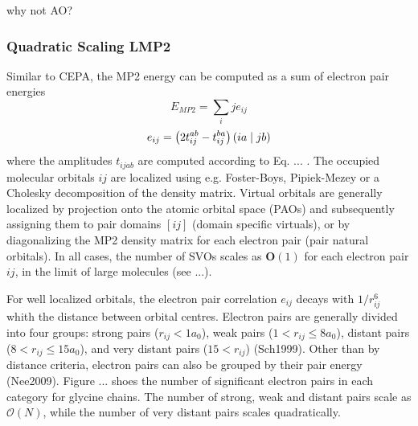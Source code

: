 why not AO?

\subsubsection{Quadratic Scaling LMP2}

Similar to CEPA, the MP2 energy can be computed as a sum of electron pair energies
\begin{equation}
E_{MP2} = \sum_ij e_{ij}
\end{equation}
\begin{equation}
e_{ij} = \left( 2t_{ij}^{ab} - t_{ij}^{ba} \right) \left( ia \mid jb \right) 
\end{equation}
\noindent where the amplitudes $t_{ijab}$ are computed according to Eq. ... . The occupied molecular orbitals $ij$ are localized using e.g. Foster-Boys, Pipiek-Mezey or a Cholesky decomposition of the density matrix. Virtual orbitals are generally localized by projection onto the atomic orbital space (PAOs) and subsequently assigning them to pair domains $[ij]$ (domain specific virtuals), or by diagonalizing the MP2 density matrix for each electron pair (pair natural orbitals).  In all cases, the number of SVOs scales as $\mathbf{O}(1)$ for each electron pair $ij$, in the limit of large molecules (see ...). 
 
For well localized orbitals, the electron pair correlation $e_{ij}$ decays with $1/r_{ij}^6$ whith the distance between orbital centres. Electron pairs are generally divided into four groups: strong pairs ($r_{ij} < 1a_0$), weak pairs ($1 < r_{ij} \leq 8 a_0$), distant pairs ($8 < r_{ij} \leq 15 a_0$), and very distant pairs ($15 < r_{ij}$) (Sch1999). Other than by distance criteria, electron pairs can also be grouped by their pair energy (Nee2009). Figure ... shoes the number of significant electron pairs in each category for glycine chains. The number of strong, weak and distant pairs scale as $\mathcal{O}(N)$, while the number of very distant pairs scales quadratically. 

